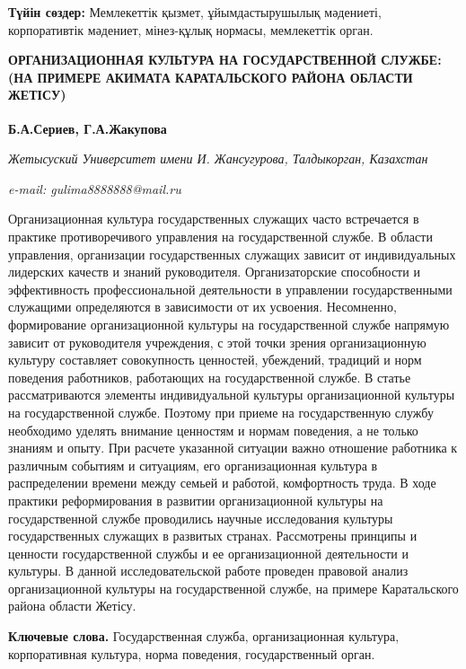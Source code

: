 {\bfseries Түйін сөздер:} Мемлекеттік қызмет, ұйымдастырушылық мәдениеті,
корпоративтік мәдениет, мінез-құлық нормасы, мемлекеттік орган.

\begin{articleheader}
{\bfseries ОРГАНИЗАЦИОННАЯ КУЛЬТУРА НА ГОСУДАРСТВЕННОЙ СЛУЖБЕ: (НА ПРИМЕРЕ АКИМАТА КАРАТАЛЬСКОГО РАЙОНА ОБЛАСТИ ЖЕТІСУ)}

{\bfseries
Б.А.Сериев,
Г.А.Жакупова\textsuperscript{\envelope }}
\end{articleheader}

\begin{affiliation}
\emph{Жетысуский Университет имени И. Жансугурова, Талдыкорган, Казахстан}

\emph{e-mail: gulima8888888@mail.ru}
\end{affiliation}

Организационная культура государственных служащих часто встречается в
практике противоречивого управления на государственной службе. В области
управления, организации государственных служащих зависит от
индивидуальных лидерских качеств и знаний руководителя. Организаторские
способности и эффективность профессиональной деятельности в управлении
государственными служащими определяются в зависимости от их усвоения.
Несомненно, формирование организационной культуры на государственной
службе напрямую зависит от руководителя учреждения, с этой точки зрения
организационную культуру составляет совокупность ценностей, убеждений,
традиций и норм поведения работников, работающих на государственной
службе. В статье рассматриваются элементы индивидуальной культуры
организационной культуры на государственной службе. Поэтому при приеме
на государственную службу необходимо уделять внимание ценностям и нормам
поведения, а не только знаниям и опыту. При расчете указанной ситуации
важно отношение работника к различным событиям и ситуациям, его
организационная культура в распределении времени между семьей и работой,
комфортность труда. В ходе практики реформирования в развитии
организационной культуры на государственной службе проводились научные
исследования культуры государственных служащих в развитых странах.
Рассмотрены принципы и ценности государственной службы и ее
организационной деятельности и культуры. В данной исследовательской
работе проведен правовой анализ организационной культуры на
государственной службе, на примере Каратальского района области Жетісу.

{\bfseries Ключевые слова.} Государственная служба, организационная
культура, корпоративная культура, норма поведения, государственный
орган.

